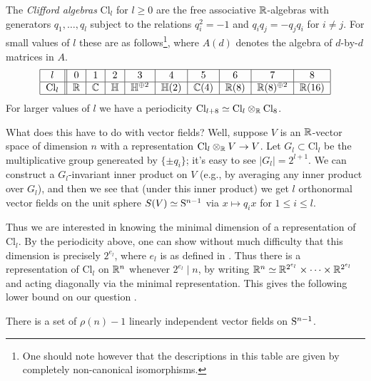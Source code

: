 \newcommand{\Cl}{\mathrm{Cl}}
\newcommand{\HH}{\mathbb{H}}
\begin{nothing}
  \label{clifford}
  The \emph{Clifford algebras} $\Cl_l$ for $l \ge 0$ are the free
  associative $\R$-algebras with generators $q_1,\ldots,q_l$ subject
  to the relations $q_i^2 = -1$ and $q_iq_j = -q_jq_i$ for $i \ne
  j$. For small values of $l$ these are as follows\footnote{One should
    note however that the descriptions in this table are given by
    completely non-canonical isomorphisms.}, where $A(d)$
  denotes the algebra of $d$-by-$d$ matrices in $A$.
  \[
    \begin{tabular}{|c||c|c|c|c|c|c|c|c|c|}
      \hline
      $l$ & 0 & 1 & 2 & 3 & 4 & 5 & 6 & 7 & 8 \\
      \hline
      $\Cl_l$ & $\R$ & $\C$ & $\HH$ & $\HH^{\oplus 2}$ & $\HH(2)$ &
      $\C(4)$ & $\R(8)$ & $\R(8)^{\oplus 2}$ & $\R(16)$ \\
      \hline
    \end{tabular}
  \]
  For larger values of $l$ we have a periodicity $\Cl_{l+8} \simeq
  \Cl_l \otimes_\R \Cl_8$.

  What does this have to do with vector fields? Well, suppose $V$ is
  an $\R$-vector space of dimension $n$ with a representation $\Cl_l
  \otimes_\R V \to V$. Let $G_l \subset \Cl_l$ be the multiplicative
  group genereated by $\{\pm q_i\}$; it's easy to see $|G_l| =
  2^{l+1}$. We can construct a $G_l$-invariant inner product on $V$
  (e.g., by averaging any inner product over $G_l$), and then we see
  that (under this inner product) we get $l$ orthonormal vector fields
  on the unit sphere $S(V) \simeq \S^{n-1}$ via $x \mapsto q_ix$ for
  $1 \le i \le l$.

  Thus we are interested in knowing the minimal dimension of a
  representation of $\Cl_l$. By the periodicity above, one can show
  without much difficulty that this dimension is precisely $2^{e_l}$,
  where $e_l$ is as defined in . Thus there is a
  representation of $\Cl_l$ on $\R^n$ whenever $2^{e_l} \mid n$, by
  writing $\R^n \simeq \R^{2^{e_l}} \times \cdots \times \R^{2^{e_l}}$
  and acting diagonally via the minimal representation. This gives the
  following lower bound on our question .
\end{nothing}

\begin{theorem}
  \label{vfield-lower-bound}
  There is a set of $\rho(n)-1$ linearly independent vector fields on
  $\S^{n-1}$.
\end{theorem}

